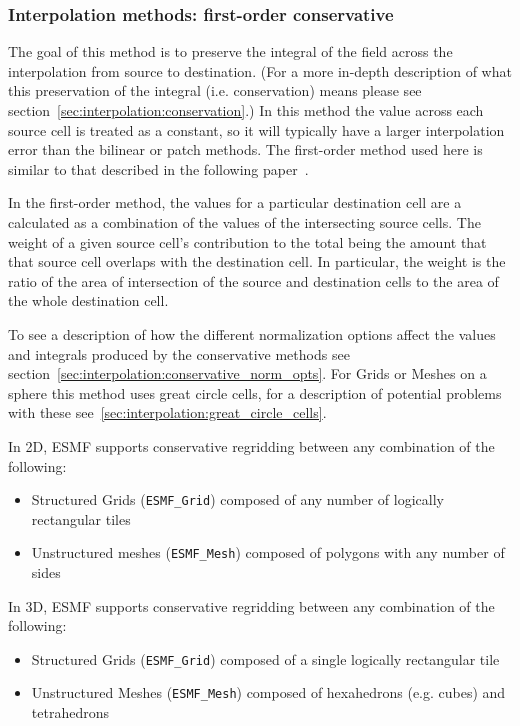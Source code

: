 \subsubsection{Interpolation methods: first-order conservative}\label{sec:interpolation:conserve}
 The goal of this method is to preserve the integral of the field across the interpolation from source to destination.  
 (For a more in-depth description of what this preservation of the integral (i.e. conservation) means please see section~\ref{sec:interpolation:conservation}.)  In this method the value across each source cell is treated as a constant, so it will typically have a larger 
 interpolation error than the bilinear or patch methods.  The first-order method used here is similar to that described in the following paper~\cite{ConservativeOrder1}.

 In the first-order method, the values for a particular destination cell are a calculated as a combination of the values of the intersecting 
 source cells. The weight of a given source cell's contribution 
 to the total being the amount that that source cell overlaps with the destination cell. 
 In particular, the weight is the ratio of the area of intersection of the source and destination cells to the area of the whole destination cell. 

 To see a description of how the different normalization options affect the values and integrals produced by the conservative methods see section~\ref{sec:interpolation:conservative_norm_opts}. For Grids or Meshes on a sphere this method uses great circle cells, for a description of potential problems with these see~\ref{sec:interpolation:great_circle_cells}.

\smallskip

 In 2D, ESMF supports conservative regridding between any combination of the following:
 \begin{itemize}
 \item Structured Grids ({\tt ESMF\_Grid}) composed of any number of logically rectangular tiles
 \item Unstructured meshes ({\tt ESMF\_Mesh}) composed of polygons with any number of sides
 \end{itemize}

\smallskip

 In 3D, ESMF supports conservative regridding between any combination of the following:
 \begin{itemize}
 \item Structured Grids ({\tt ESMF\_Grid}) composed of a single logically rectangular tile
 \item Unstructured Meshes ({\tt ESMF\_Mesh}) composed of hexahedrons (e.g. cubes) and tetrahedrons
 \end{itemize}

